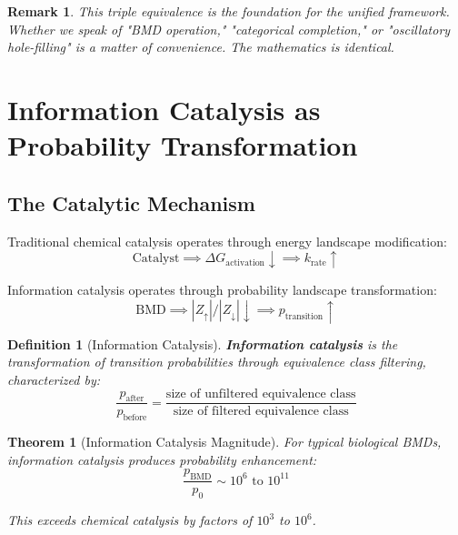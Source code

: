 \documentclass[12pt,a4paper]{article}
\newtheorem{theorem}{Theorem}
\newtheorem{definition}{Definition}
\newtheorem{remark}{Remark}
\begin{document}
\begin{remark}
This triple equivalence is the foundation for the unified framework. Whether we speak of "BMD operation," "categorical completion," or "oscillatory hole-filling" is a matter of convenience. The mathematics is identical.
\end{remark}

\section{Information Catalysis as Probability Transformation}

\subsection{The Catalytic Mechanism}

Traditional chemical catalysis operates through energy landscape modification:
\begin{equation}
\text{Catalyst} \implies \Delta G_{\text{activation}} \downarrow \implies k_{\text{rate}} \uparrow
\end{equation}

Information catalysis operates through probability landscape transformation:
\begin{equation}
\text{BMD} \implies |Z_{\uparrow}|/|Z_{\downarrow}| \downarrow \implies p_{\text{transition}} \uparrow
\end{equation}

\begin{definition}[Information Catalysis]
\label{def:info_catalysis}
\textbf{Information catalysis} is the transformation of transition probabilities through equivalence class filtering, characterized by:
\begin{equation}
\frac{p_{\text{after}}}{p_{\text{before}}} = \frac{\text{size of unfiltered equivalence class}}{\text{size of filtered equivalence class}}
\end{equation}
\end{definition}

\begin{theorem}[Information Catalysis Magnitude]
\label{thm:info_cat_magnitude}
For typical biological BMDs, information catalysis produces probability enhancement:
\begin{equation}
\frac{p_{\text{BMD}}}{p_0} \sim 10^6 \text{ to } 10^{11}
\end{equation}

This exceeds chemical catalysis by factors of $10^3$ to $10^6$.
\end{theorem}
\end{document}
